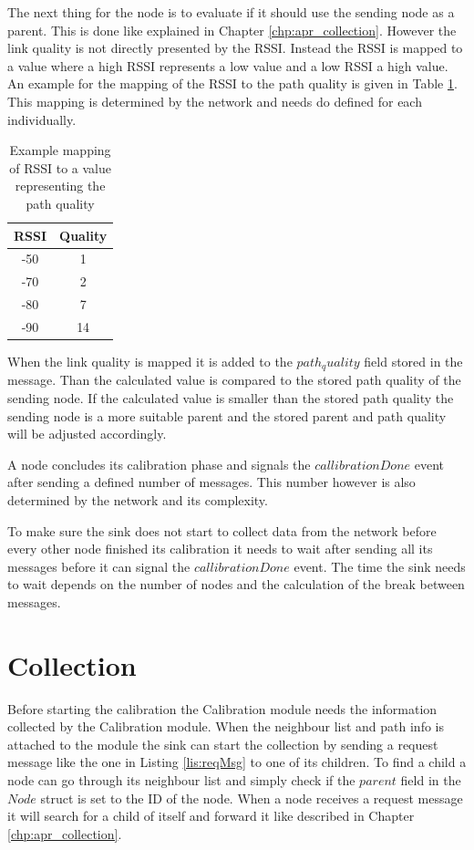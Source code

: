 The next thing for the node is to evaluate if it should use the sending node as a parent. This is done like explained in Chapter \ref{chp:apr_collection}. However the link quality is not directly presented by the RSSI. Instead the RSSI is mapped to a value where a high RSSI represents a low value and a low RSSI a high value. An example for the mapping of the RSSI to the path quality is given in Table \ref{tab:mappingRSSI}. This mapping is determined by the network and needs do defined for each individually.
\begin{table}[htbp]
 \caption{Example mapping of RSSI to a value representing the path quality}
 \centering
 \begin{tabular}{c|c}
  RSSI & Quality\\ \toprule
  -50 & 1 \\
  -70 & 2 \\
  -80 & 7 \\
  -90 & 14 \\
 \end{tabular}
 \label{tab:mappingRSSI}
\end{table}
When the link quality is mapped it is added to the $path_quality$ field stored in the message. Than the calculated value is compared to the stored path quality of the sending node. If the calculated value is smaller than the stored path quality the sending node is a more suitable parent and the stored parent and path quality will be adjusted accordingly.   

A node concludes its calibration phase and signals the $callibrationDone$ event after sending a defined number of messages. This number however is also determined by the network and its complexity.  

To make sure the sink does not start to collect data from the network  before every other node finished its calibration it needs to wait after sending all its messages before it can signal the $callibrationDone$ event. The time the sink needs to wait depends on the number of nodes and the calculation of the break between messages.
 
\section{Collection}
\label{chp:imp_collection}
Before starting the calibration the Calibration module needs the information collected by the Calibration module. When the neighbour list and path info is attached to the module the sink can start the collection by sending a request message like the one in Listing \ref{lis:reqMsg} to one of its children. To find a child a node can go through its neighbour list and simply check if the $parent$ field in the $Node$ struct is set to the ID of the node. When a node receives a request message it will search for a child of itself and forward it like described in Chapter \ref{chp:apr_collection}.

